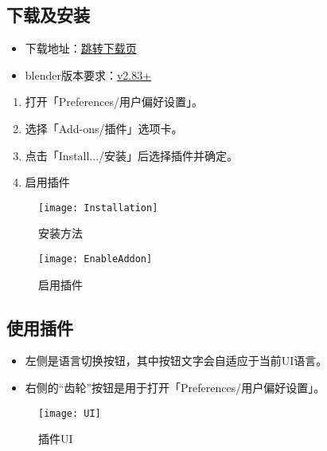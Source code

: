 \documentclass{resources/DocClass}
\begin{document}
    \subsection{下载及安装}
    \begin{itemize}
        \item 下载地址：\href{https://github.com/Mister-Kin/ToggleLanguage/releases/latest}{跳转下载页}
        \item blender版本要求：\href{https://www.blender.org/download/}{v2.83+}
    \end{itemize}

    \begin{enumerate}
        \item 打开「Preferences/用户偏好设置」。
        \item 选择「Add-ons/插件」选项卡。
        \item 点击「Install.../安装」后选择插件并确定。
        \item 启用插件
    \end{enumerate}

    \begin{figure}[htbp]
        \begin{minipage}[t]{0.45\textwidth}
            \texttt{[image: Installation]}
            \caption*{安装方法}
        \end{minipage}
        \qquad
        \begin{minipage}[t]{0.45\textwidth}
            \texttt{[image: EnableAddon]}
            \caption*{启用插件}
        \end{minipage}
    \end{figure}

    \subsection{使用插件}
    \begin{itemize}
        \item 左侧是语言切换按钮，其中按钮文字会自适应于当前UI语言。
        \item 右侧的“齿轮”按钮是用于打开「Preferences/用户偏好设置」。
    \end{itemize}

    \begin{figure}[htbp]
        \centering
        \texttt{[image: UI]}
        \caption*{插件UI}
    \end{figure}
\end{document}
